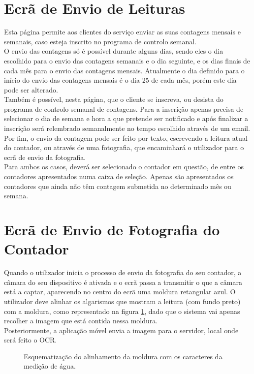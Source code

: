 \section{Ecrã de Envio de Leituras} \label{ecra:leituras}
Esta página permite aos clientes do serviço enviar as suas contagens mensais e semanais, caso esteja inscrito no programa de controlo semanal.\\
O envio das contagens só é possível durante alguns dias, sendo eles o dia escolhido para o envio das contagens semanais e o dia seguinte, e os dias finais de cada mês para o envio das contagens mensais. Atualmente o dia definido para o início do envio das contagens mensais é o dia 25 de cada mês, porém este dia pode ser alterado.\\
Também é possível, nesta página, que o cliente se inscreva, ou desista do programa de controlo semanal de contagens. Para a inscrição apenas precisa de selecionar o dia de semana e hora a que pretende ser notificado e após finalizar a inscrição será relembrado semanalmente no tempo escolhido através de um email.\\
Por fim, o envio da contagem pode ser feito por texto, escrevendo a leitura atual do contador, ou através de uma fotografia, que encaminhará o utilizador para o ecrã de envio da fotografia.\\
Para ambos os casos, deverá ser selecionado o contador em questão, de entre os contadores apresentados numa caixa de seleção. Apenas são apresentados os contadores que ainda não têm contagem submetida no determinado mês ou semana.

\section{Ecrã de Envio de Fotografia do Contador} \label{ecra:foto}
Quando o utilizador inicia o processo de envio da fotografia do seu contador, a câmara do seu dispositivo é ativada e o ecrã passa a transmitir o que a câmara está a captar, aparecendo no centro do ecrã uma moldura retangular azul. O utilizador deve alinhar os algarismos que mostram a leitura (com fundo preto) com a moldura, como representado na figura \ref{fig:moldura}, dado que o sistema vai apenas recolher a imagem que está contida nessa moldura.\\
Posteriormente, a aplicação móvel envia a imagem para o servidor, local onde será feito o OCR.

\begin{figure}[h!]
\begin{center}
\caption{Esquematização do alinhamento da moldura com os caracteres da medição de água.}
\label{fig:moldura}
\end{center}
\end{figure}

